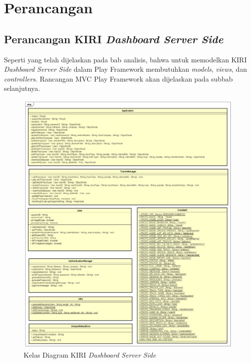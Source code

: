 \chapter{Perancangan}
\label{chap:perancangan}

\section{Perancangan KIRI \textit{Dashboard Server Side}}
\label{sec:perancangan_kiri_dashboard_server_side}
Seperti yang telah dijelaskan pada bab analisis, bahwa untuk memodelkan KIRI \textit{Dashboard Server Side} dalam Play Framework membutuhkan \textit{models}, \textit{views}, dan \textit{controllers}. Rancangan MVC Play Framework akan dijelaskan pada subbab selanjutnya.

\begin{figure}[htbp]
	\centering
		\includegraphics[scale=0.4]{Gambar/4_classdiagram.png}
	\caption{Kelas Diagram KIRI \textit{Dashboard Server Side}}
	\label{fig:4_classdiagram}
\end{figure}

